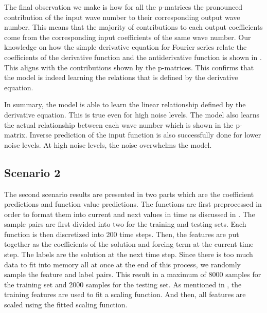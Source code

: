The final observation we make is how for all the p-matrices the pronounced contribution of the input wave number to their corresponding output wave number. This means that the majority of contributions to each output coefficients come from the corresponding input coefficients of the same wave number. Our knowledge on how the simple derivative equation for Fourier series relate the coefficients of the derivative function and the antiderivative function is shown in . This aligns with the contributions shown by the p-matrices. This confirms that the model is indeed learning the relations that is defined by the derivative equation.

In summary, the model is able to learn the linear relationship defined by the derivative equation. This is true even for high noise levels. The model also learns the actual relationship between each wave number which is shown in the p-matrix. Inverse prediction of the input function is also successfully done for lower noise levels. At high noise levels, the noise overwhelms the model.

\subsection{Scenario 2}
\noindent The second scenario results are presented in two parts which are the coefficient predictions and function value predictions. The functions are first preprocessed in order to format them into current and next values in time as discussed in . The sample pairs are first divided into two for the training and testing sets. Each function is then discretized into 200 time steps. Then, the features are put together as the coefficients of the solution and forcing term at the current time step. The labels are the solution at the next time step. Since there is too much data to fit into memory all at once at the end of this process, we randomly sample the feature and label pairs. This result in a maximum of 8000 samples for the training set and 2000 samples for the testing set. As mentioned in , the training features are used to fit a scaling function. And then, all features are scaled using the fitted scaling function.

